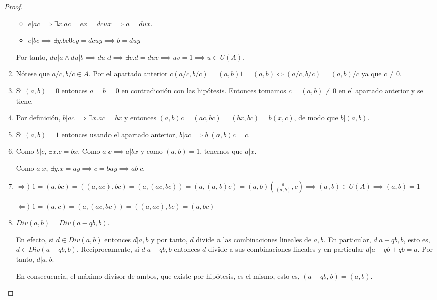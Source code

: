 \begin{proof}
\begin{enumerate}
	\begin{itemize}
	\item $e|ac \implies \exists x.ac = ex = dcux \implies a = dux$.
	\item $e|bc \implies \exists y.bc 0 ey = dcuy \implies b = duy$
	\end{itemize}
	
	Por tanto, $du|a \land du|b \implies du|d \implies \exists v. d = duv \implies uv = 1 \implies u \in U(A)$. 
	 
	\item Nótese que $a/c,b/c \in A$. Por el apartado anterior $c(a/c,b/c) = (a,b)1 = (a,b) \iff (a/c,b/c) = (a,b)/c$ ya que $c \neq 0$. 
	
	\item Si $(a,b) = 0$ entonces $a = b = 0$ en contradicción con las hipótesis. Entonces tomamos $c = (a,b) \neq 0$ en el apartado anterior y se tiene. 
	
	\item Por definición, $b|ac \implies \exists x.ac = bx$ y entonces $(a,b)c = (ac,bc) = (bx,bc) = b(x,c)$, de modo que $b|(a,b)$. 
	
	\item  Si $(a,b) = 1$ entonces usando el apartado anterior, $b|ac \implies b| (a,b)c = c$. 
	
	\item Como $b|c$, $\exists x. c = bx$. Como $a|c \implies a|bx$ y como $(a,b) = 1$, tenemos que $a|x$. 
	
	Como $a|x$, $\exists y.x = ay \implies c = bay \implies ab|c$. 
	
	\item $\Rightarrow)$ $1 = (a,bc) = ((a,ac),bc) = (a,(ac,bc)) = (a,(a,b)c) = (a,b)(\frac{a}{(a,b)},c) \implies (a,b) \in U(A) \implies (a,b) = 1$
	
	$\Leftarrow)$ $1 = (a,c) = (a,(ac,bc)) = ((a,ac),bc) = (a,bc)$
	\item $Div(a,b) = Div(a-qb,b)$. 
	
	En efecto, si $d \in Div(a,b)$ entonces $d|a,b$ y por tanto, $d$ divide a las combinaciones lineales de $a,b$. En particular, $d|a-qb,b$, esto es, $d \in Div(a-qb,b)$. Recíprocamente, si $d|a-qb,b$ entonces $d$ divide a sus combinaciones lineales y en particular $d|a-qb+qb = a$. Por tanto, $d|a,b$. 
	
	En consecuencia, el máximo divisor de ambos, que existe por hipótesis, es el mismo, esto es, $(a-qb,b) = (a,b)$.  
	\end{enumerate}
	 	
\end{proof}

